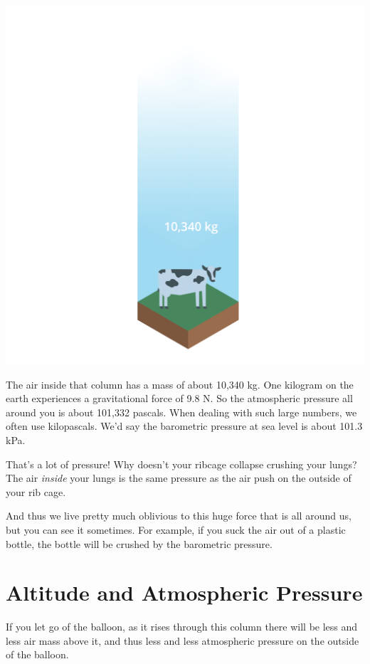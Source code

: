 \includegraphics[width=\textwidth]{aircolumn.png}

The air inside that column has a mass of about 10,340 kg.  One kilogram on the earth experiences a gravitational force of 9.8 N.   
So the atmospheric pressure all around you is about 101,332 pascals.  
When dealing with such large numbers, we often use kilopascals.  
We'd say the barometric pressure at sea level is about 101.3 kPa.

That's a lot of pressure!  Why doesn't your ribcage collapse crushing your lungs?  The air \emph{inside} your lungs is the same 
pressure as the air push on the outside of your rib cage.  

And thus we live pretty much oblivious to this huge force that is all around us, but you can see it sometimes.  
For example, if you suck the air out of a plastic bottle,   the bottle will be crushed by the barometric pressure.

\section{Altitude and Atmospheric Pressure}

If you let go of the balloon, as it rises through this column there will be less and less air mass above it, and thus less and less atmospheric pressure on the outside of the balloon. 


